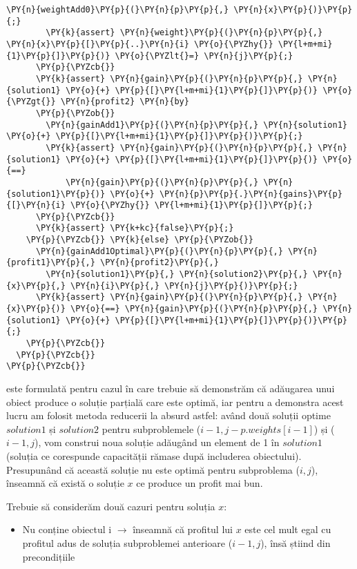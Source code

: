 \begin{sloppypar}
\begin{enumerate}
\begin{Verbatim}[commandchars=\\\{\}]
        \PY{n}{weightAdd0}\PY{p}{(}\PY{n}{p}\PY{p}{,} \PY{n}{x}\PY{p}{)}\PY{p}{;}
        \PY{k}{assert} \PY{n}{weight}\PY{p}{(}\PY{n}{p}\PY{p}{,} \PY{n}{x}\PY{p}{[}\PY{p}{..}\PY{n}{i} \PY{o}{\PYZhy{}} \PY{l+m+mi}{1}\PY{p}{]}\PY{p}{)} \PY{o}{\PYZlt{}=} \PY{n}{j}\PY{p}{;}
      \PY{p}{\PYZcb{}}
      \PY{k}{assert} \PY{n}{gain}\PY{p}{(}\PY{n}{p}\PY{p}{,} \PY{n}{solution1} \PY{o}{+} \PY{p}{[}\PY{l+m+mi}{1}\PY{p}{]}\PY{p}{)} \PY{o}{\PYZgt{}} \PY{n}{profit2} \PY{n}{by} 
      \PY{p}{\PYZob{}}
        \PY{n}{gainAdd1}\PY{p}{(}\PY{n}{p}\PY{p}{,} \PY{n}{solution1} \PY{o}{+} \PY{p}{[}\PY{l+m+mi}{1}\PY{p}{]}\PY{p}{)}\PY{p}{;}
        \PY{k}{assert} \PY{n}{gain}\PY{p}{(}\PY{n}{p}\PY{p}{,} \PY{n}{solution1} \PY{o}{+} \PY{p}{[}\PY{l+m+mi}{1}\PY{p}{]}\PY{p}{)} \PY{o}{==} 
            \PY{n}{gain}\PY{p}{(}\PY{n}{p}\PY{p}{,} \PY{n}{solution1}\PY{p}{)} \PY{o}{+} \PY{n}{p}\PY{p}{.}\PY{n}{gains}\PY{p}{[}\PY{n}{i} \PY{o}{\PYZhy{}} \PY{l+m+mi}{1}\PY{p}{]}\PY{p}{;}
      \PY{p}{\PYZcb{}}
      \PY{k}{assert} \PY{k+kc}{false}\PY{p}{;} 
    \PY{p}{\PYZcb{}} \PY{k}{else} \PY{p}{\PYZob{}}
      \PY{n}{gainAdd1Optimal}\PY{p}{(}\PY{n}{p}\PY{p}{,} \PY{n}{profit1}\PY{p}{,} \PY{n}{profit2}\PY{p}{,} 
        \PY{n}{solution1}\PY{p}{,} \PY{n}{solution2}\PY{p}{,} \PY{n}{x}\PY{p}{,} \PY{n}{i}\PY{p}{,} \PY{n}{j}\PY{p}{)}\PY{p}{;}
      \PY{k}{assert} \PY{n}{gain}\PY{p}{(}\PY{n}{p}\PY{p}{,} \PY{n}{x}\PY{p}{)} \PY{o}{==} \PY{n}{gain}\PY{p}{(}\PY{n}{p}\PY{p}{,} \PY{n}{solution1} \PY{o}{+} \PY{p}{[}\PY{l+m+mi}{1}\PY{p}{]}\PY{p}{)}\PY{p}{;}
    \PY{p}{\PYZcb{}}
  \PY{p}{\PYZcb{}}
\PY{p}{\PYZcb{}}
\end{Verbatim}
     este formulată pentru cazul în care trebuie să demonstrăm că adăugarea unui obiect produce o soluție parțială care este optimă, iar pentru a demonstra acest lucru am folosit metoda reducerii la absurd astfel: având două soluții optime $solution1$ și $solution2$ pentru subproblemele ($i - 1, j - p.weights[i - 1]$) și ($i - 1, j$), vom construi noua soluție adăugând un element de 1 în $solution1$ (soluția ce corespunde capacității rămase după includerea obiectului). Presupunând că această soluție nu este optimă pentru subproblema ($i, j$), înseamnă că există o soluție $x$ ce produce un profit mai bun. \par 
     \hspace{2mm} Trebuie să considerăm două cazuri pentru soluția $x$: 
     \begin{itemize}
         \item Nu conține obiectul i $\rightarrow$ înseamnă că profitul lui $x$ este cel mult egal cu profitul adus de soluția subproblemei anterioare ($i - 1, j$), însă știind din precondițiile 

\end{itemize}
\end{enumerate}
\end{sloppypar}
